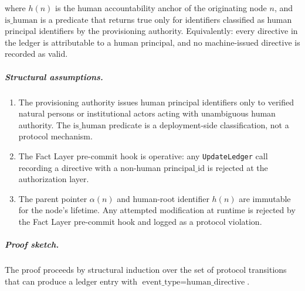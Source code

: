 where $h(n)$ is the human accountability anchor of the originating node $n$, and $\text{is\_human}$ is a predicate that returns true only for identifiers classified as human principal identifiers by the provisioning authority. Equivalently: every directive in the ledger is attributable to a human principal, and no machine-issued directive is recorded as valid.

\subparagraph{Structural assumptions.}
\begin{enumerate}
\item[\textbf{A3.1}] The provisioning authority issues human principal identifiers only to verified natural persons or institutional actors acting with unambiguous human authority. The $\text{is\_human}$ predicate is a deployment-side classification, not a protocol mechanism.
\item[\textbf{A3.2}] The Fact Layer pre-commit hook is operative: any \texttt{UpdateLedger} call recording a directive with a non-human $\text{principal\_id}$ is rejected at the authorization layer.
\item[\textbf{A3.3}] The parent pointer $\alpha(n)$ and human-root identifier $h(n)$ are immutable for the node's lifetime. Any attempted modification at runtime is rejected by the Fact Layer pre-commit hook and logged as a protocol violation.
\end{enumerate}

\subparagraph{Proof sketch.} The proof proceeds by structural induction over the set of protocol transitions that can produce a ledger entry with $\text{event\_type} = \text{human\_directive}$.

